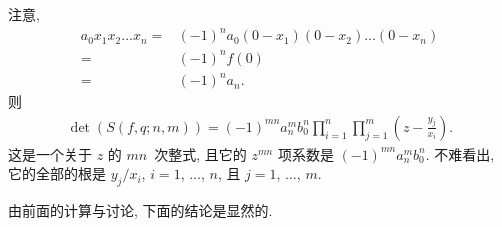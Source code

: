 \documentclass[../libro.tex]{subfiles}
\begin{document}
注意,
\begin{align*}
    a_0 x_1 x_2 \dots x_n
    = {} &
    (-1)^n a_0 (0 - x_1) (0 - x_2) \dots (0 - x_n)
    \\
    = {} &
    (-1)^n f(0)
    \\
    = {} &
    (-1)^n a_n.
\end{align*}
则
\begin{align*}
    \det {(S(f, q; n, m))}
    = (-1)^{m n} a_n^m b_0^n
    \prod_{i = 1}^{n} \prod_{j = 1}^{m}
    {\left( z - \frac{y_j}{x_i} \right)}.
\end{align*}
这是一个关于 \(z\) 的 \(m n\)~次整式,
且它的 \(z^{m n}\) 项系数是 \((-1)^{m n} a_n^m b_0^n\).
不难看出, 它的全部的根是 \(y_j / x_i\),
\(i = 1\), \(\dots\), \(n\),
且 \(j = 1\), \(\dots\), \(m\).

由前面的计算与讨论, 下面的结论是显然的.
\end{document}

